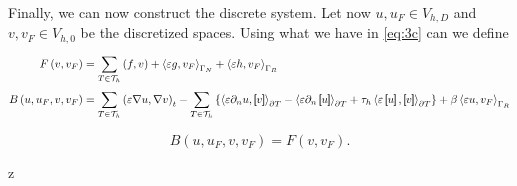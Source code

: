 Finally, we can now construct the discrete system. Let now $u, u_{F} \in V_{h,D}$ and $v, v_{F} \in V_{h,0}$ be the
discretized spaces. Using what we have in \eqref{eq:3c} can we define \[
    \begin{split}
F\left( v, v_{F} \right) & =  \sum_{T
\in \mathcal{T} _{h}}^{} \left( f,v \right)  + \left<\varepsilon g, v_{F} \right>_{\Gamma _{N}} + \left<\varepsilon h,
v_{F} \right>_{\Gamma _{R}} \\
B\left( u, u_{F} , v, v_{F} \right)  &=
    \sum_{T \in \mathcal{T} _{h}}^{}   \left( \varepsilon \nabla u, \nabla v \right) _{t} -\sum_{T \in \mathcal{T} _{h}}^{}
\left\{ \left<\varepsilon  \partial _{n} u , \jump{ v } \right> _{\partial T}  -\left<\varepsilon \partial _{n} \jump{u} \right>_{\partial T}  + \tau _{h} \left<\varepsilon \jump{u},
\jump{v} \right>_{\partial T} \right\}  + \beta  \left< \varepsilon u, v_{F}  \right>_{\Gamma _{R}} \\
    \end{split}
\]

\begin{equation}
\label{eq:3f }
B\left( u, u_{F} , v, v_{F} \right) = F\left( v, v_{F} \right)
.\end{equation}






z
